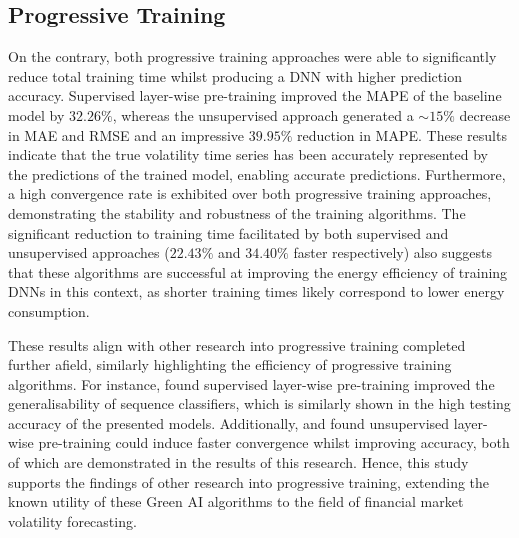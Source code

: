 \documentclass[a4paper, 11pt]{report}
\begin{document}
    \subsection{Progressive Training}

    On the contrary, both progressive training approaches were able to significantly reduce total training time whilst producing a DNN with higher prediction accuracy. Supervised layer-wise pre-training improved the MAPE of the baseline model by $32.26\%$, whereas the unsupervised approach generated a $\sim \! 15\%$ decrease in MAE and RMSE and an impressive $39.95\%$ reduction in MAPE. These results indicate that the true volatility time series has been accurately represented by the predictions of the trained model, enabling accurate predictions. Furthermore, a high convergence rate is exhibited over both progressive training approaches, demonstrating the stability and robustness of the training algorithms. The significant reduction to training time facilitated by both supervised and unsupervised approaches ($22.43\%$ and $34.40\%$ faster respectively) also suggests that these algorithms are successful at improving the energy efficiency of training DNNs in this context, as shorter training times likely correspond to lower energy consumption.

    These results align with other research into progressive training completed further afield, similarly highlighting the efficiency of progressive training algorithms. For instance, \citet{ienco-2019} found supervised layer-wise pre-training improved the generalisability of sequence classifiers, which is similarly shown in the high testing accuracy of the presented models. Additionally, \citet{xu-2018} and \citet{sagheer-2019} found unsupervised layer-wise pre-training could induce faster convergence whilst improving accuracy, both of which are demonstrated in the results of this research. Hence, this study supports the findings of other research into progressive training, extending the known utility of these Green AI algorithms to the field of financial market volatility forecasting.
\end{document}
